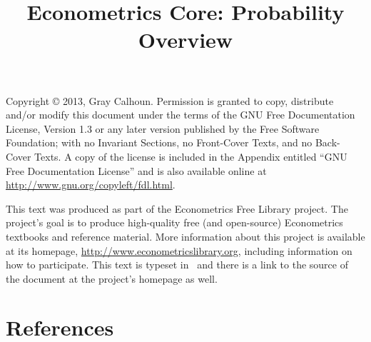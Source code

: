 \documentclass[nofonts]{tufte-latex/tufte-handout}
\title{Econometrics Core: Probability Overview}
\begin{document}
\maketitle

\bigskip\noindent%
Copyright © 2013, Gray Calhoun.  Permission is granted to copy,
distribute and/or modify this document under the terms of the GNU Free
Documentation License, Version 1.3 or any later version published by
the Free Software Foundation; with no Invariant Sections, no
Front-Cover Texts, and no Back-Cover Texts.  A copy of the license is
included in the Appendix entitled ``GNU Free Documentation License''
and is also available online at
\url{http://www.gnu.org/copyleft/fdl.html}.

This text was produced as part of the Econometrics Free Library
project.  The project's goal is to produce high-quality free (and
open-source) Econometrics textbooks and reference material.  More
information about this project is available at its homepage,
\url{http://www.econometricslibrary.org}, including information on how
to participate.  This text is typeset in \XeLaTeX\ and there is a link
to the source of the document at the project's homepage as well.

%
\tableofcontents







\appendix


\part*{References}%

\end{document}
